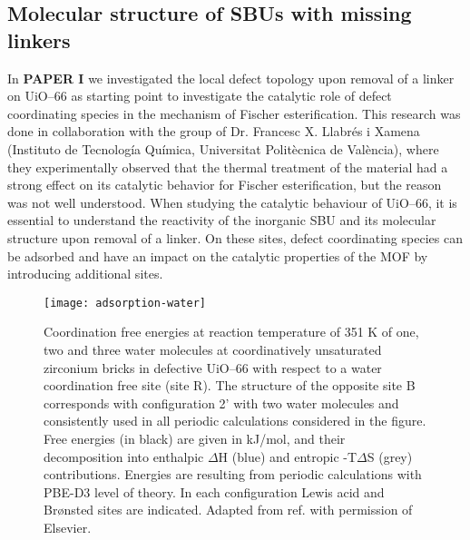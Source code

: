 \subsection*{Molecular structure of SBUs with missing linkers}
In \textbf{PAPER I} we investigated the local defect topology upon removal of a linker on UiO--66 as starting point to investigate the catalytic role of defect coordinating species in the mechanism of Fischer esterification. This research was done in collaboration with the group of Dr. Francesc X. Llabr\'es i Xamena (Instituto de Tecnolog\'{i}a Qu\'{i}mica, Universitat Polit\`ecnica de Val\`encia), where they experimentally observed that the thermal treatment of the material had a strong effect on its catalytic behavior for Fischer esterification, but the reason was not well understood. When studying the catalytic behaviour of UiO--66, it is essential to understand the reactivity of the inorganic SBU and its molecular structure upon removal of a linker. On these sites, defect coordinating species can be adsorbed and have an impact on the catalytic properties of the MOF by introducing additional sites. 
\begin{figure}[!htbp]
	\centering
	\texttt{[image: adsorption-water]}
	\caption{Coordination free energies at reaction temperature of 351 K of one, two and three water molecules at coordinatively unsaturated zirconium bricks in defective UiO--66 with respect to a water coordination free site (site R). The structure of the opposite site B corresponds with configuration 2’ with two water molecules and consistently used in all periodic calculations considered in the figure. Free energies (in black) are given in kJ/mol, and their decomposition into enthalpic $\Delta$H (blue) and entropic -T$\Delta$S (grey) contributions. Energies are resulting from periodic calculations with PBE-D3 level of theory. In each configuration Lewis acid and Brønsted sites are indicated. Adapted from ref. \cite{caratelli2017nature} with permission of Elsevier.}
	\label{fig:adsorption-water}
\end{figure}

